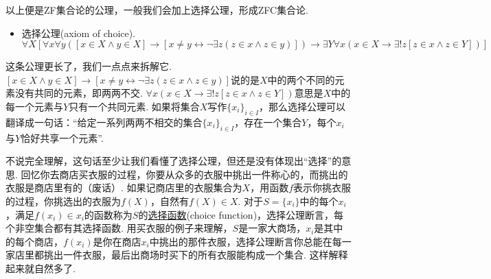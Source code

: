 \vspace{1cm}

以上便是\textsf{ZF}集合论的公理，一般我们会加上选择公理，形成\textsf{ZFC}集合论.

\begin{itemize}
    \item  [(7)] 选择公理(axiom of choice).
    \[\forall X [\forall x \forall y([x \in X \wedge y \in X] \rightarrow [x \neq y \leftrightarrow \neg \exists z(z \in x \wedge z \in y)]) \rightarrow \exists Y \forall x(x \in X \rightarrow \exists! z[z \in x \wedge z \in Y])]\]
\end{itemize}

\begin{note}
    这条公理更长了，我们一点点来拆解它. \([x \in X \wedge y \in X] \rightarrow [x \neq y \leftrightarrow \neg \exists z(z \in x \wedge z \in y)]\)说的是\(X\)中的两个不同的元素没有共同的元素，即两两不交. \(\forall x(x \in X \rightarrow \exists! z[z \in x \wedge z \in Y])\)意思是\(X\)中的每一个元素与\(Y\)只有一个共同元素. 如果将集合\(X\)写作\(\{x_i\}_{i \in I}\)，那么选择公理可以翻译成一句话：“给定一系列两两不相交的集合\(\{x_i\}_{i \in I}\)，存在一个集合\(Y\)，每个\(x_i\)与\(Y\)恰好共享一个元素”.

    不说完全理解，这句话至少让我们看懂了选择公理，但还是没有体现出“选择”的意思. 回忆你去商店买衣服的过程，你要从众多的衣服中挑出一件称心的，而挑出的衣服是商店里有的（废话）. 如果记商店里的衣服集合为\(X\)，用函数\(f\)表示你挑衣服的过程，你挑选出的衣服为\(f(X)\)，自然有\(f(X) \in X\). 对于\(S=\{x_i\}\)中的每个\(x_i\)，满足\(f(x_i) \in x_i\)的函数称为\(S\)的\underline{选择函数}(choice function)，选择公理断言，每个非空集合都有其选择函数. 用买衣服的例子来理解，\(S\)是一家大商场，\(x_i\)是其中的每个商店，\(f(x_i)\)是你在商店\(x_i\)中挑出的那件衣服，选择公理断言你总能在每一家店里都挑出一件衣服，最后出商场时买下的所有衣服能构成一个集合. 这样解释起来就自然多了.
\end{note}

\vspace{1cm}

